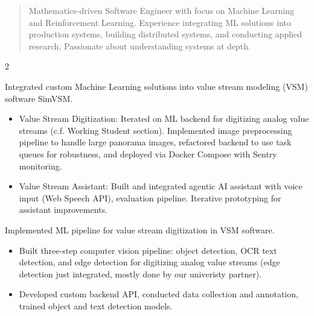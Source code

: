 \documentclass[10pt,a4paper,ragged2e,withhyper]{altacv}
\author{Andreas Loehr}
\date{\today}
\title{}
\begin{document}
\makecvheader
\vspace{0.2cm}
 \begin{quote}
 Mathematics-driven Software Engineer with focus on Machine Learning and Reinforcement Learning. Experience integrating ML solutions into production systems, building distributed systems, and conducting applied research. Passionate about understanding systems at depth.
 \end{quote}
\vspace{0.2cm}
\begin{paracol}{2}
\label{sec:orga280c27}

Integrated custom Machine Learning solutions into value stream modeling (VSM) software SimVSM.

\begin{itemize}
\item Value Stream Digitization: Iterated on ML backend for digitizing analog value streams (c.f. Working Student section). Implemented image preprocessing pipeline to handle large panorama images, refactored backend to use task queues for robustness, and deployed via Docker Compose with Sentry monitoring.
\item Value Stream Assistant: Built and integrated agentic AI assistant with voice input (Web Speech API), evaluation pipeline. Iterative prototyping for assistant improvements.
\end{itemize}

\par\divider


Implemented ML pipeline for value stream digitization in VSM software.

\begin{itemize}
\item Built three-step computer vision pipeline: object detection, OCR text detection, and edge detection for digitizing analog value streams (edge detection just integrated, mostly done by our univeristy partner).
\item Developed custom backend API, conducted data collection and annotation, trained object and text detection models.
\end{itemize}


\end{paracol}
\end{document}

